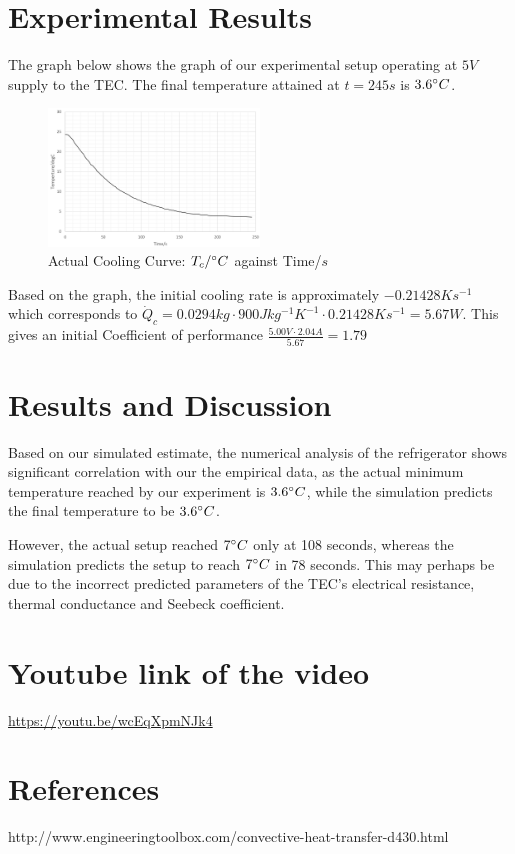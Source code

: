 \documentclass[12pt,a4paper]{IEEEtran}
\begin{document}
	\section{Experimental Results}
	The graph below shows the graph of our experimental setup operating at $5V$ supply to the TEC. The final temperature attained at $t = 245s$ is $3.6\degree C$.
	\begin{figure}[H]
		\includegraphics[width=0.5\textwidth]{cooling.png}
		\begin{center}
			\caption{Actual Cooling Curve: $T_c/\degree C$ against Time/$s$}
			\label{fig:cooling}
		\end{center}
	\end{figure}
	Based on the graph, the initial cooling rate is approximately $-0.21428Ks^{-1}$ which corresponds to $\dot{Q}_c = 0.0294kg \cdot 900Jkg^{-1}K^{-1} \cdot 0.21428Ks^{-1} = 5.67W$.
	This gives an initial Coefficient of performance $\frac{5.00V \cdot 2.04A}{5.67} = 1.79$
	\section{Results and Discussion}
	Based on our simulated estimate, the numerical analysis of the refrigerator shows significant correlation with our the empirical data, as the actual minimum temperature reached by our experiment is $3.6\degree C$, while the simulation predicts the final temperature to be $3.6\degree C$. \par
	
	However, the actual setup reached $7\degree C$ only at 108 seconds, whereas the simulation predicts the setup to reach $7\degree C$ in 78 seconds. This may perhaps be due to the incorrect predicted parameters of the TEC's electrical resistance, thermal conductance and Seebeck coefficient.
	
	\section{Youtube link of the video}
	\begin{center}
	\href{https://youtu.be/wcEqXpmNJk4}{https://youtu.be/wcEqXpmNJk4}
	\end{center}
	
	\section{References}
	http://www.engineeringtoolbox.com/convective-heat-transfer-d\textunderscore430.html
	
\end{document}
